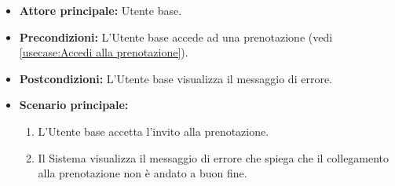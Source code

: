 \label{usecase:Accesso prenotazione fallito}
\begin{itemize}
	\item \textbf{Attore principale:} Utente base.

	\item \textbf{Precondizioni:}
	      L'Utente base accede ad una prenotazione (vedi \autoref{usecase:Accedi alla prenotazione}).

	\item \textbf{Postcondizioni:}
	      L'Utente base visualizza il messaggio di errore.

	\item \textbf{Scenario principale:}
	      \begin{enumerate}
		      \item L'Utente base accetta l'invito alla prenotazione.

		      \item Il Sistema visualizza il messaggio di errore che spiega che il collegamento alla prenotazione non è andato a buon fine.
	      \end{enumerate}
\end{itemize}